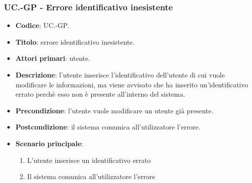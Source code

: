 	\subsubsection{UC\theuccount.\thesubuccount-GP - Errore identificativo inesistente}
		
		\begin{itemize}
			\item \textbf{Codice}: UC\theuccount.\thesubuccount-GP.
			\item \textbf{Titolo}: errore identificativo inesistente.
			\item \textbf{Attori primari}: utente.
			\item \textbf{Descrizione}:  l’utente inserisce l'identificativo dell'utente di cui vuole modificare le informazioni, ma viene avvisato che ha inserito un'identificativo errato perchè esso non è presente all'interno del sistema.
			\item \textbf{Precondizione}: l'utente vuole modificare un utente già presente.
			\item \textbf{Postcondizione}: il sistema comunica all’utilizzatore l’errore.
			\item \textbf{Scenario principale}:
			\begin{enumerate}
				\item L'utente inserisce un identificativo errato 
				\item Il sistema comunica all’utilizzatore l’errore
			\end{enumerate}
		\end{itemize}